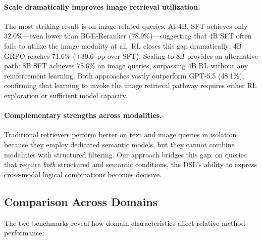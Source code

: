\paragraph{Scale dramatically improves image retrieval utilization.}
The most striking result is on image-related queries. At 4B, SFT achieves only 32.0\%---even lower than BGE-Reranker (78.9\%)---suggesting that 4B SFT often fails to utilize the image modality at all. RL closes this gap dramatically: 4B GRPO reaches 71.6\% (+39.6~pp over SFT). Scaling to 8B provides an alternative path: 8B SFT achieves 75.6\% on image queries, surpassing 4B RL without any reinforcement learning. Both approaches vastly outperform GPT-5.5 (48.1\%), confirming that learning to invoke the image retrieval pathway requires either RL exploration or sufficient model capacity.

\paragraph{Complementary strengths across modalities.}
Traditional retrievers perform better on text and image queries in isolation because they employ dedicated semantic models, but they cannot combine modalities with structured filtering. Our approach bridges this gap: on queries that require \emph{both} structured and semantic conditions, the DSL's ability to express cross-modal logical combinations becomes decisive.


\subsection{Comparison Across Domains}
\label{sec:cross_domain}

The two benchmarks reveal how domain characteristics affect relative method performance:

